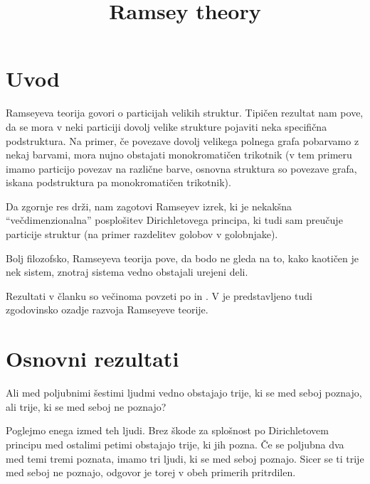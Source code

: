 \documentclass[twoside,11pt]{article}
\begin{document}



\title{Ramsey theory}

\glava\baselineskip=14.5pt

\smallskip

\section{Uvod}

\hspace{\parindent}Ramseyeva teorija govori o particijah velikih struktur. Tipičen rezultat nam pove, da 
se mora v neki particiji dovolj velike strukture pojaviti neka specifična podstruktura. Na primer, 
če povezave dovolj velikega polnega grafa pobarvamo z nekaj barvami, mora nujno obstajati 
monokromatičen trikotnik (v tem primeru imamo particijo povezav na različne barve, 
osnovna struktura so povezave grafa, iskana podstruktura pa monokromatičen trikotnik).

Da zgornje res drži, nam zagotovi Ramseyev izrek, ki je nekakšna ``večdimenzionalna'' posplošitev 
Dirichletovega principa, ki tudi sam preučuje particije struktur (na primer razdelitev golobov v
golobnjake).

Bolj filozofsko, Ramseyeva teorija pove, da bodo ne gleda na to, kako kaotičen je nek sistem, 
znotraj sistema vedno obstajali urejeni deli.

Rezultati v članku so večinoma povzeti po \cite{color} in \cite{west}. V \cite{color} je 
predstavljeno tudi zgodovinsko ozadje razvoja Ramseyeve teorije.

\section{Osnovni rezultati}
\begin{zgled}
    Ali med poljubnimi šestimi ljudmi vedno obstajajo trije, ki se med seboj
    poznajo, ali trije, ki se med seboj ne poznajo?

    Poglejmo enega izmed teh ljudi. Brez škode za splošnost po Dirichletovem principu med 
    ostalimi petimi obstajajo trije, ki jih pozna. Če se poljubna dva med temi tremi poznata, 
    imamo tri ljudi, ki se med seboj poznajo. Sicer se ti trije med seboj ne poznajo, odgovor je 
    torej v obeh primerih pritrdilen.
\end{zgled}
\end{document}
